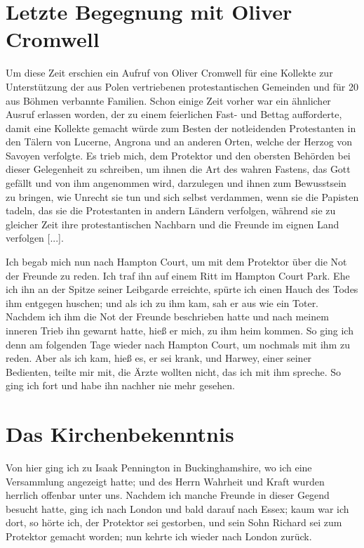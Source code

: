\section{Letzte Begegnung mit Oliver Cromwell}

Um diese Zeit erschien ein Aufruf von Oliver 
Cromwell für
eine Kollekte zur Unterstützung der aus Polen vertriebenen 
protestantischen Gemeinden  und 
für 20 aus Böhmen verbannte
Familien. Schon einige Zeit vorher war ein ähnlicher Ausruf
erlassen worden, der zu einem feierlichen Fast- und Bettag 
aufforderte, damit eine Kollekte gemacht würde zum Besten der 
notleidenden Protestanten in den Tälern von 
Lucerne, Angrona und
an anderen Orten, welche der Herzog von 
Savoyen verfolgte.
Es trieb mich, dem Protektor und den obersten Behörden bei
dieser Gelegenheit zu schreiben, um ihnen die Art des wahren
Fastens, das Gott gefällt und von ihm angenommen wird, 
darzulegen und ihnen zum Bewusstsein zu bringen, wie Unrecht sie
tun und sich selbst verdammen, wenn sie die 
Papisten tadeln,
das sie die Protestanten in andern Ländern 
verfolgen, während
sie zu gleicher Zeit ihre protestantischen Nachbarn und die
Freunde im eignen Land verfolgen [...].


Ich begab mich nun nach Hampton Court, um mit dem
Protektor über die Not der Freunde zu reden. Ich traf ihn auf
einem Ritt im Hampton Court Park. 
Ehe ich ihn an der Spitze
seiner Leibgarde erreichte, spürte ich einen Hauch des Todes
ihm entgegen huschen; und als ich zu ihm kam, sah er aus wie
ein Toter. Nachdem ich ihm die Not der Freunde beschrieben
hatte und nach meinem inneren Trieb ihn gewarnt hatte, hieß
er mich, zu ihm heim kommen. So ging ich denn am folgenden
Tage wieder nach Hampton Court, um nochmals mit ihm zu
reden. Aber als ich kam, hieß es, er sei krank, und Harwey,
einer seiner Bedienten, teilte mir mit, die Ärzte wollten nicht,
das ich mit ihm spreche. So ging ich fort und habe ihn nachher
nie mehr gesehen.

\section{Das Kirchenbekenntnis}


Von hier ging ich zu Isaak Pennington 
in Buckinghamshire, 
wo ich eine Versammlung angezeigt hatte; und des Herrn 
Wahrheit und Kraft wurden herrlich offenbar unter uns. Nachdem
ich manche Freunde in dieser Gegend besucht hatte, ging ich
nach London und bald darauf nach 
Essex; kaum war ich dort,
so hörte ich, der Protektor sei gestorben, und sein Sohn 
Richard
sei zum Protektor gemacht worden; nun kehrte ich wieder nach
London zurück.


